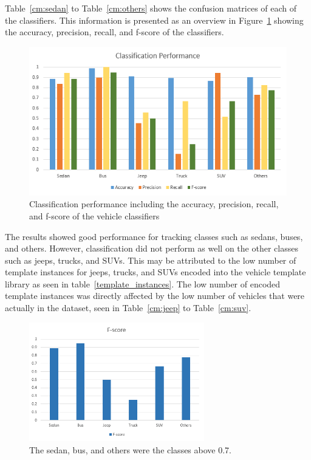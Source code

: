 \documentclass[conference]{IEEEtran}
\begin{document}
Table~\ref{cm:sedan} to Table~\ref{cm:others} shows the confusion matrices of each of the classifiers. This information is presented as an overview in Figure~\ref{fig_classifier_performance} showing the accuracy, precision, recall, and f-score of the classifiers.

\begin{figure}[!ht]
\centering
\includegraphics[scale=0.8]{classification_performance.png}
\caption{Classification performance including the accuracy, precision, recall, and f-score of the vehicle classifiers}
\label{fig_classifier_performance}
\end{figure}

The results showed good performance for tracking classes such as sedans, buses, and others. However, classification did not perform as well on the other classes such as jeeps, trucks, and SUVs. This may be attributed to the low number of template instances for jeeps, trucks, and SUVs encoded into the vehicle template library as seen in table~\ref{template_instances}. The low number of encoded template instances was directly affected by the low number of vehicles that were actually in the dataset, seen in Table~\ref{cm:jeep} to Table~\ref{cm:suv}.

\begin{figure}[!ht]
\centering
\includegraphics[width=3in]{Fscore.png}
\caption{The sedan, bus, and others were the classes above 0.7.}
\label{fig_fscore_performance}
\end{figure}
\end{document}
